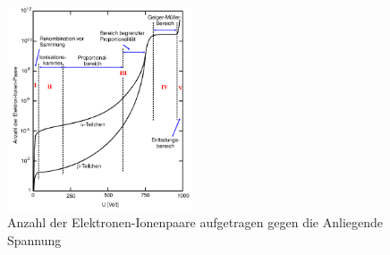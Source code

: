 \begin{figure}
  \centering
  \includegraphics[height = 6cm]{./logos/GM-Kurve.PNG}
  \caption{Anzahl der Elektronen-Ionenpaare aufgetragen gegen die Anliegende Spannung \cite{Anleitung}}
  \label{fig:GM-Kurve}
\end{figure}
